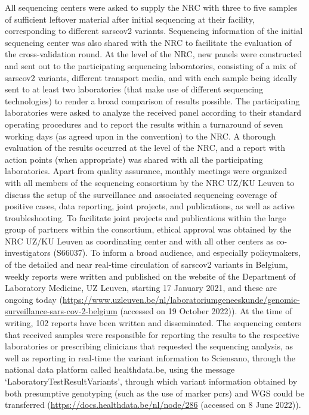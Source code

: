 All sequencing centers were asked to supply the NRC with three to five samples of sufficient leftover material after initial sequencing at their facility, corresponding to different \gls{sarscov2} variants.
Sequencing information of the initial sequencing center was also shared with the NRC to facilitate the evaluation of the cross-validation round.
At the level of the NRC, new panels were constructed and sent out to the participating sequencing laboratories, consisting of a mix of \gls{sarscov2} variants, different transport media, and with each sample being ideally sent to at least two laboratories (that make use of different sequencing technologies) to render a broad comparison of results possible.
The participating laboratories were asked to analyze the received panel according to their standard operating procedures and to report the results within a turnaround of seven working days (as agreed upon in the convention) to the NRC.
A thorough evaluation of the results occurred at the level of the NRC, and a report with action points (when appropriate) was shared with all the participating laboratories.
Apart from quality assurance, monthly meetings were organized with all members of the sequencing consortium by the NRC UZ/KU Leuven to discuss the setup of the surveillance and associated sequencing coverage of positive cases, data reporting, joint projects, and publications, as well as active troubleshooting.
To facilitate joint projects and publications within the large group of partners within the consortium, ethical approval was obtained by the NRC UZ/KU Leuven as coordinating center and with all other centers as co-investigators (S66037).
To inform a broad audience, and especially policymakers, of the detailed and near real-time circulation of \gls{sarscov2} variants in Belgium, weekly reports were written and published on the website of the Department of Laboratory Medicine, UZ Leuven, starting 17 January 2021, and these are ongoing today (\url{https://www.uzleuven.be/nl/laboratoriumgeneeskunde/genomic-surveillance-sars-cov-2-belgium} (accessed on 19 October 2022)).
At the time of writing, 102 reports have been written and disseminated.
The sequencing centers that received samples were responsible for reporting the results to the respective laboratories or prescribing clinicians that requested the sequencing analysis, as well as reporting in real-time the variant information to Sciensano, through the national data platform called healthdata.be, using the message `LaboratoryTestResultVariants', through which variant information obtained by both presumptive genotyping (such as the use of marker \gls{pcr}s) and WGS could be transferred (\url{https://docs.healthdata.be/nl/node/286} (accessed on 8 June 2022)).
